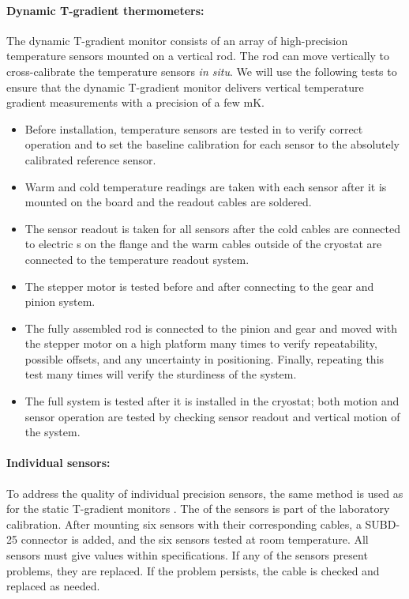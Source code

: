 \paragraph{Dynamic T-gradient thermometers:}
\label{sec:fdgen-slow-cryo-qc-thdy}

The dynamic T-gradient monitor consists of an array of high-precision temperature sensors mounted on a vertical rod. The rod can move vertically to cross-calibrate the temperature sensors \textit{in situ}. %
We will use the following %
tests to ensure that the dynamic T-gradient monitor delivers vertical temperature gradient measurements with a precision of a few \si{mK}.

\begin{itemize}
\item
Before installation, temperature sensors are tested in  
to verify correct operation and to set the baseline calibration for each sensor to the absolutely calibrated reference sensor. 
\item
Warm and cold temperature readings are taken with each sensor after it is mounted on the  board and the readout cables are soldered. %
\item
The sensor readout is taken for all sensors after the cold cables are connected to electric \fdth{}s on the flange and the warm cables outside of the cryostat are connected to the temperature readout system.
\item 
The stepper motor is tested before and after connecting to the gear and pinion system.
\item
The fully assembled rod is connected to the pinion and gear and moved with the stepper motor on a high platform many times to verify repeatability, possible offsets, and any uncertainty in positioning. Finally, repeating this test many times will verify the sturdiness of the system.
\item
The full system is tested after it is installed in the cryostat; both motion and sensor operation are tested by checking %
sensor readout and vertical motion of the system.
\end{itemize} 

\paragraph{Individual sensors:}
\label{sec:fdgen-slow-cryo-qc-is}

To address the quality of individual precision sensors, the same method is used as for the static T-gradient monitors %
.
The  of the sensors is part of the laboratory calibration. After mounting six sensors with their corresponding cables, a
SUBD-25 connector %
is added, and the six sensors tested at room temperature. All sensors %
must %
give values within specifications.  
If any of the sensors present problems, they are replaced.  If the problem persists, the cable is checked and replaced as needed.

